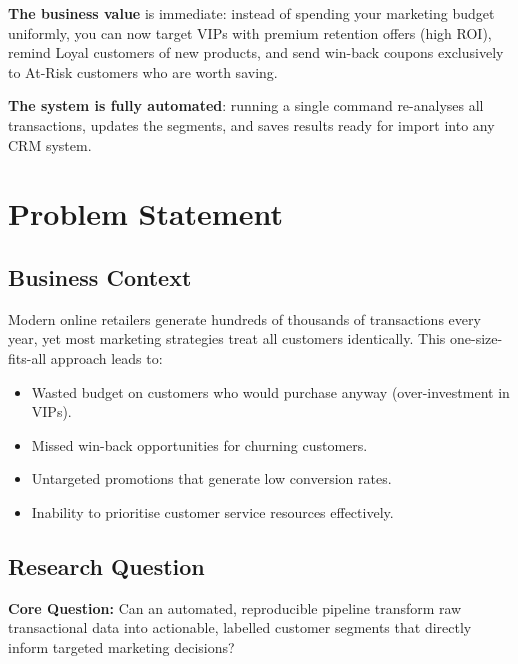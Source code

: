 \documentclass[12pt,a4paper]{report}
\begin{document}
\textbf{The business value} is immediate: instead of spending your marketing budget uniformly, you can now target VIPs with premium retention offers (high ROI), remind Loyal customers of new products, and send win-back coupons exclusively to At-Risk customers who are worth saving.

\textbf{The system is fully automated}: running a single command re-analyses all transactions, updates the segments, and saves results ready for import into any CRM system.

\newpage
\tableofcontents
\newpage

\chapter{Problem Statement}

\section{Business Context}

Modern online retailers generate hundreds of thousands of transactions every year, yet most marketing strategies treat all customers identically. This one-size-fits-all approach leads to:

\begin{itemize}[leftmargin=1.8em]
  \item Wasted budget on customers who would purchase anyway (over-investment in VIPs).
  \item Missed win-back opportunities for churning customers.
  \item Untargeted promotions that generate low conversion rates.
  \item Inability to prioritise customer service resources effectively.
\end{itemize}

\section{Research Question}

\begin{infobox}
\textbf{Core Question:} Can an automated, reproducible pipeline transform raw transactional data into actionable, labelled customer segments that directly inform targeted marketing decisions?
\end{infobox}
\end{document}
